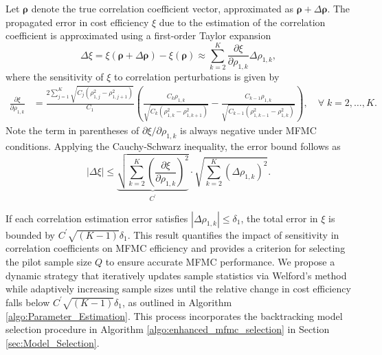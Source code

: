 Let $\boldsymbol{\rho}$ denote the true correlation coefficient vector, approximated as $\boldsymbol{\rho}+\Delta \boldsymbol{\rho}$. The propagated error in cost efficiency $\xi$ due to the estimation of the correlation coefficient is approximated using a first-order Taylor expansion 
%
\[
\Delta\xi=\xi(\boldsymbol{\rho}+\Delta \boldsymbol{\rho}) - \xi(\boldsymbol{\rho}) \approx \sum_{k=2}^K \frac{\partial \xi}{\partial \rho_{1,k}} \Delta\rho_{1,k},
\]
%
where the sensitivity of $\xi$ to correlation perturbations is given by
%
\begin{align*}
    \frac{\partial  \xi}{\partial  \rho_{1,k}} 
&=\frac{2\sum_{j=1}^K\sqrt{C_j\left(\rho_{1,j}^2 - \rho_{1,j+1}^2\right)}}{C_1}\left(\frac{C_k\rho_{1,k}}{\sqrt{C_k(\rho_{1,k}^2-\rho_{1,k+1}^2)}}-\frac{C_{k-1}\rho_{1,k}}{\sqrt{C_{k-1}(\rho_{1,k-1}^2-\rho_{1,k}^2)}}\right), \quad \forall\; k=2,\ldots, K.
\end{align*}
%
Note the term in parentheses of $\partial \xi/\partial \rho_{1,k}$ is always negative under MFMC conditions. Applying the Cauchy-Schwarz inequality, the error bound follows as
%
\begin{equation}\label{eq:delta_xi_bound}
    \left|\Delta \xi\right|\le \underbrace{\sqrt{\sum_{k=2}^K \left(\frac{\partial \xi}{\partial \rho_{1,k}}\right)^2}}_{C^\prime} \cdot \sqrt{\sum_{k=2}^K\left(\Delta\rho_{1,k}\right)^2}.
\end{equation}


%
If each correlation estimation error satisfies $|\Delta \rho_{1,k}| \leq \delta_1$, the total error in $\xi$ is bounded by $C^\prime \sqrt{(K-1)}\delta_1$. This result quantifies the impact of sensitivity in correlation coefficients on MFMC efficiency and provides a criterion for selecting the pilot sample size $Q$ to ensure accurate MFMC performance. We propose a dynamic strategy that iteratively updates sample statistics via Welford’s method while adaptively increasing sample sizes until the relative change in cost efficiency falls below $C^\prime \sqrt{(K-1)}\delta_1$, as outlined in Algorithm \ref{algo:Parameter_Estimation}. This process incorporates the backtracking model selection procedure in Algorithm \ref{algo:enhanced_mfmc_selection} in Section \ref{sec:Model_Selection}.



